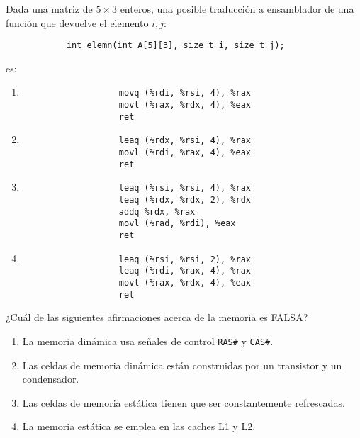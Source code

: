 \documentclass[12pt]{article}
\begin{document}
    \begin{ejercicio}
        Dada una matriz de $5\times 3$ enteros, una posible traducción a ensamblador de una función que devuelve el elemento $i,j$: 
        \begin{verbatim}
            int elemn(int A[5][3], size_t i, size_t j);
        \end{verbatim}
        es:
        \begin{enumerate}[label=\alph*)]
            \item 
                \begin{verbatim}
                   movq (%rdi, %rsi, 4), %rax
                   movl (%rax, %rdx, 4), %eax
                   ret
                \end{verbatim}
            \item 
                \begin{verbatim}
                   leaq (%rdx, %rsi, 4), %rax
                   movl (%rdi, %rax, 4), %eax
                   ret
                \end{verbatim}
            \item 
                \begin{verbatim}
                   leaq (%rsi, %rsi, 4), %rax
                   leaq (%rdx, %rdx, 2), %rdx
                   addq %rdx, %rax
                   movl (%rad, %rdi), %eax
                   ret
                \end{verbatim}
            \item 
                \begin{verbatim}
                   leaq (%rsi, %rsi, 2), %rax
                   leaq (%rdi, %rax, 4), %rax
                   movl (%rax, %rdx, 4), %eax
                   ret
                \end{verbatim}
        \end{enumerate}
    \end{ejercicio}
    \begin{ejercicio}
        ¿Cuál de las siguientes afirmaciones acerca de la memoria es FALSA?
        \begin{enumerate}[label=\alph*)]
            \item La memoria dinámica usa señales de control \verb|RAS#| y \verb|CAS#|.
            \item Las celdas de memoria dinámica están construidas por un transistor y un condensador.
            \item Las celdas de memoria estática tienen que ser constantemente refrescadas.
            \item La memoria estática se emplea en las caches L1 y L2.
        \end{enumerate}
    \end{ejercicio}
\end{document}
